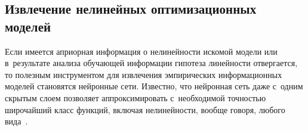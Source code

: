 \begin{multicols}{2}
\vspace*{-6pt}

\section{Извлечение нелинейных оптимизационных моделей}

\renewcommand{\figurename}{\protect\bf Рис.}
\setcounter{figure}{1}



Если имеется априорная информация о нелинейности искомой модели 
или в~результате анализа обучающей информации гипотеза линейности 
отвергается, то полезным инструментом для извлечения эмпирических 
информационных моделей становятся  нейронные сети. Известно, что 
нейронная сеть даже с~одним скрытым слоем позволяет 
аппроксимировать с~необходимой точностью широчайший класс 
функций, включая нелинейности, вообще говоря, любого вида~\cite{13-don}.

 \renewcommand{\figurename}{\protect\bf Алгоритм}
\setcounter{figure}{1}

\begin{figure*}
\vspace*{-6pt}
\vspace*{2ex}


\end{figure*}
\end{multicols}
